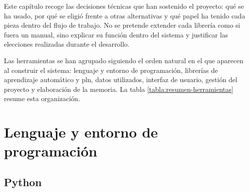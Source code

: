 
Este capítulo recoge las decisiones técnicas que han sostenido el proyecto: qué se ha usado, por qué se eligió frente a otras alternativas y qué papel ha tenido cada pieza dentro del flujo de trabajo. No se pretende extender cada librería como si fuera un manual, sino explicar su función dentro del sistema y justificar las elecciones realizadas durante el desarrollo.

Las herramientas se han agrupado siguiendo el orden natural en el que aparecen al construir el sistema: lenguaje y entorno de programación, librerías de aprendizaje automático y \gls{pln}, datos utilizados, interfaz de usuario, gestión del proyecto y elaboración de la memoria. La tabla \ref{tabla:resumen-herramientas} resume esta organización.


\section{Lenguaje y entorno de programación}

\subsection{Python}

